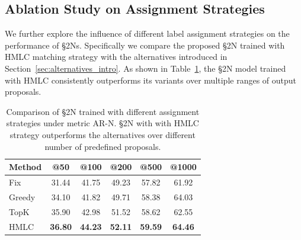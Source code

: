 \documentclass[10pt,journal,compsoc]{IEEEtran}
\begin{document}


\subsection{Ablation Study on Assignment Strategies} 
We further explore the influence of different label assignment strategies on the performance of \S2Ns. Specifically we compare the proposed \S2N trained with HMLC matching strategy with the alternatives introduced in Section~\ref{sec:alternatives_intro}. As shown in Table~\ref{results:different_assign}, the \S2N model trained with HMLC consistently outperforms its variants over multiple ranges of output proposals.

\setlength{\tabcolsep}{10pt}
\begin{table}
\centering
\begin{tabular}{   l   c   c  c   c  c }
\toprule
  Method & @50 & @100 & @200 & @500 &  @1000\\
 \midrule
 Fix  & 31.44 & 41.75 & 49.23 & 57.82 & 61.92 \\ 
 Greedy  & 34.10 & 41.82 & 49.71 & 58.38 & 64.03 \\ 
 TopK & 35.90 & 42.98 & 51.52 & 58.62 & 62.55 \\ 
 HMLC & \textbf{36.80} & \textbf{44.23} & \textbf{52.11} & \textbf{59.59} & \textbf{64.46} \\ 
\bottomrule
\end{tabular}
\caption{Comparison of \S2N trained with different assignment strategies under metric AR-N. \S2N with with HMLC strategy outperforms the alternatives over different number of predefined proposals.\label{results:different_assign}}

\end{table}



\end{document}
